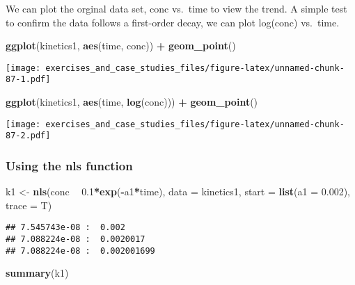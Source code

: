 \documentclass[]{book}
\newenvironment{Shaded}{\begin{snugshade}}{\end{snugshade}}
\newcommand{\DataTypeTok}[1]{\textcolor[rgb]{0.13,0.29,0.53}{#1}}
\newcommand{\FloatTok}[1]{\textcolor[rgb]{0.00,0.00,0.81}{#1}}
\newcommand{\KeywordTok}[1]{\textcolor[rgb]{0.13,0.29,0.53}{\textbf{#1}}}
\newcommand{\NormalTok}[1]{#1}
\newcommand{\OperatorTok}[1]{\textcolor[rgb]{0.81,0.36,0.00}{\textbf{#1}}}
\newcommand{\StringTok}[1]{\textcolor[rgb]{0.31,0.60,0.02}{#1}}
\theoremstyle{definition}
\theoremstyle{definition}
\theoremstyle{definition}
\theoremstyle{remark}
\begin{document}
We can plot the orginal data set, conc vs.~time to view the trend. A
simple test to confirm the data follows a first-order decay, we can plot
log(conc) vs.~time.

\begin{Shaded}
\begin{Highlighting}[]
\KeywordTok{ggplot}\NormalTok{(kinetics1, }\KeywordTok{aes}\NormalTok{(time, conc)) }\OperatorTok{+}
\StringTok{  }\KeywordTok{geom_point}\NormalTok{()}
\end{Highlighting}
\end{Shaded}

\texttt{[image: exercises\_and\_case\_studies\_files/figure-latex/unnamed-chunk-87-1.pdf]}

\begin{Shaded}
\begin{Highlighting}[]
\KeywordTok{ggplot}\NormalTok{(kinetics1, }\KeywordTok{aes}\NormalTok{(time, }\KeywordTok{log}\NormalTok{(conc))) }\OperatorTok{+}
\StringTok{  }\KeywordTok{geom_point}\NormalTok{()}
\end{Highlighting}
\end{Shaded}

\texttt{[image: exercises\_and\_case\_studies\_files/figure-latex/unnamed-chunk-87-2.pdf]}

\hypertarget{using-the-nls-function}{%
\subsubsection{Using the nls function}\label{using-the-nls-function}}

\begin{Shaded}
\begin{Highlighting}[]
\NormalTok{k1 <-}\StringTok{ }\KeywordTok{nls}\NormalTok{(conc }\OperatorTok{~}\StringTok{ }\FloatTok{0.1}\OperatorTok{*}\KeywordTok{exp}\NormalTok{(}\OperatorTok{-}\NormalTok{a1}\OperatorTok{*}\NormalTok{time), }
          \DataTypeTok{data =}\NormalTok{ kinetics1, }\DataTypeTok{start =} \KeywordTok{list}\NormalTok{(}\DataTypeTok{a1 =} \FloatTok{0.002}\NormalTok{), }\DataTypeTok{trace =}\NormalTok{ T)}
\end{Highlighting}
\end{Shaded}

\begin{verbatim}
## 7.545743e-08 :  0.002
## 7.088224e-08 :  0.0020017
## 7.088224e-08 :  0.002001699
\end{verbatim}

\begin{Shaded}
\begin{Highlighting}[]
\KeywordTok{summary}\NormalTok{(k1)}
\end{Highlighting}
\end{Shaded}
\end{document}
